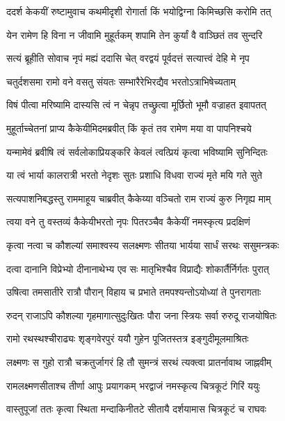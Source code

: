 \twolineshloka
{ददर्श केकयीं रुष्टामुवाच कथमीदृशी}
{रोगार्ता किं भयोद्विग्ना किमिच्छसि करोमि तत्} %

\twolineshloka
{येन रामेण हि विना न जीवामि मुहूर्तकम्}
{शपामि तेन कुर्यां वै वाञ्छितं तव सुन्दरि} %

\twolineshloka
{सत्यं ब्रूहीति सोवाच नृपं मह्यं ददासि चेत्}
{वरद्वयं पूर्वदत्तं सत्यात्त्वं देहि मे नृप} %

\twolineshloka
{चतुर्दशसमा रामो वने वसतु संयतः}
{सम्भारैरेभिरद्यैव भरतोऽत्राभिषेच्यताम्} %

\twolineshloka
{विषं पीत्वा मरिष्यामि दास्यसि त्वं न चेन्नृप}
{तच्छ्रुत्वा मूर्छितो भूमौ वज्राहत इवापतत्} %

\twolineshloka
{मुहूर्ताच्चेतनां प्राप्य कैकेयीमिदमब्रवीत्}
{किं कृतं तव रामेण मया वा पापनिश्चये} %

\twolineshloka
{यन्मामेवं ब्रवीषि त्वं सर्वलोकाप्रियङ्करि}
{केवलं त्वत्प्रियं कृत्वा भविष्यामि सुनिन्दितः} %

\twolineshloka
{या त्वं भार्या कालरात्री भरतो नेदृशः सुतः}
{प्रशाधि विधवा राज्यं मृते मयि गते सुते} %

\twolineshloka
{सत्यपाशनिबद्धस्तु राममाहूय चाब्रवीत्}
{कैकेय्या वञ्चितो राम राज्यं कुरु निगृह्य माम्} %

\twolineshloka
{त्वया वने तु वस्तव्यं कैकेयीभरतो नृपः}
{पितरञ्चैव कैकेयीं नमस्कृत्य प्रदक्षिणं} %

\twolineshloka
{कृत्वा नत्वा च कौशल्यां समाश्वस्य सलक्ष्मणः}
{सीतया भार्यया सार्धं सरथः ससुमन्त्रकः} %

\twolineshloka
{दत्वा दानानि विप्रेभ्यो दीनानाथेभ्य एव सः}
{मातृभिश्चैव विप्राद्यैः शोकार्तैर्निर्गतः पुरात्} %

\twolineshloka
{उषित्वा तमसातीरे रात्रौ पौरान् विहाय च}
{प्रभाते तमपश्यन्तोऽयोध्यां ते पुनरागताः} %

\twolineshloka
{रुदन् राजाऽपि कौशल्या गृहमागात्सुदुःखितः}
{पौरा जना स्त्रियः सर्वा रुरुदू राजयोषितः} %

\twolineshloka
{रामो रथस्थश्चीराढ्यः शृङ्गवेरपुरं ययौ}
{गुहेन पूजितस्तत्र इङ्गुदीमूलमाश्रितः} %

\twolineshloka
{लक्ष्मणः स गुहो रात्रौ चक्रतुर्जागरं हि तौ}
{सुमन्त्रं सरथं त्यक्त्वा प्रातर्नावाथ जाह्नवीम्} %

\twolineshloka
{रामलक्ष्मणसीताश्च तीर्णा आपुः प्रयागकम्}
{भरद्वाजं नमस्कृत्य चित्रकूटं गिरिं ययुः} %

\twolineshloka
{वास्तुपूजां ततः कृत्वा स्थिता मन्दाकिनीतटे}
{सीतायै दर्शयामास चित्रकूटं च राघवः} %

